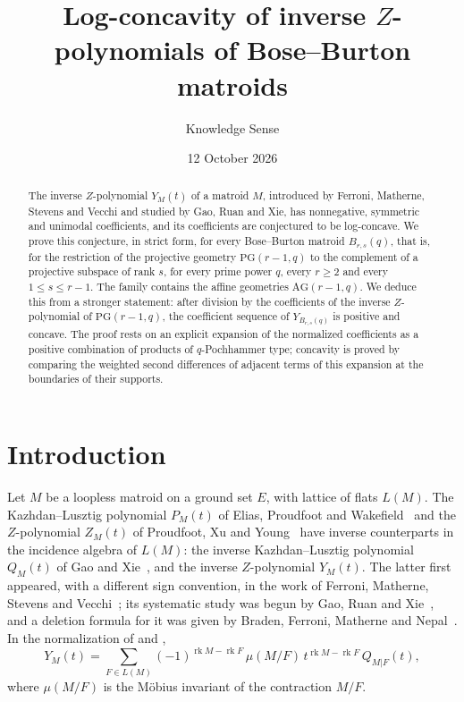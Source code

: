\documentclass{amsart}
\theoremstyle{remark}
\numberwithin{equation}{section}
\newcommand{\PG}{\mathrm{PG}}
\newcommand{\AG}{\mathrm{AG}}
\newcommand{\rk}{\operatorname{rk}}
\begin{document}
\title[Inverse $Z$-polynomials of Bose--Burton matroids]{Log-concavity of inverse $Z$-polynomials of Bose--Burton matroids}

\author{Knowledge Sense}

\date{12 October 2026}



\begin{abstract}
The inverse $Z$-polynomial $Y_M(t)$ of a matroid $M$, introduced by Ferroni, Matherne, Stevens and Vecchi and studied by Gao, Ruan and Xie, has nonnegative, symmetric and unimodal coefficients, and its coefficients are conjectured to be log-concave. We prove this conjecture, in strict form, for every Bose--Burton matroid $B_{r,s}(q)$, that is, for the restriction of the projective geometry $\PG(r-1,q)$ to the complement of a projective subspace of rank $s$, for every prime power $q$, every $r\ge 2$ and every $1\le s\le r-1$. The family contains the affine geometries $\AG(r-1,q)$. We deduce this from a stronger statement: after division by the coefficients of the inverse $Z$-polynomial of $\PG(r-1,q)$, the coefficient sequence of $Y_{B_{r,s}(q)}$ is positive and concave. The proof rests on an explicit expansion of the normalized coefficients as a positive combination of products of $q$-Pochhammer type; concavity is proved by comparing the weighted second differences of adjacent terms of this expansion at the boundaries of their supports.
\end{abstract}

\maketitle

\section{Introduction}

Let $M$ be a loopless matroid on a ground set $E$, with lattice of flats $L(M)$. The Kazhdan--Lusztig polynomial $P_M(t)$ of Elias, Proudfoot and Wakefield~\cite{EPW} and the $Z$-polynomial $Z_M(t)$ of Proudfoot, Xu and Young~\cite{PXY} have inverse counterparts in the incidence algebra of $L(M)$: the inverse Kazhdan--Lusztig polynomial $Q_M(t)$ of Gao and Xie~\cite{GX}, and the inverse $Z$-polynomial $Y_M(t)$. The latter first appeared, with a different sign convention, in the work of Ferroni, Matherne, Stevens and Vecchi~\cite{FMSV}; its systematic study was begun by Gao, Ruan and Xie~\cite{GRX}, and a deletion formula for it was given by Braden, Ferroni, Matherne and Nepal~\cite{BFMN}. In the normalization of \cite[(2)--(3)]{GRX} and \cite[Theorem~2.2]{BFMN},
\begin{equation}\label{eq:Ydef}
  Y_M(t)=\sum_{F\in L(M)}(-1)^{\rk M-\rk F}\,\mu(M/F)\,t^{\rk M-\rk F}\,Q_{M|F}(t),
\end{equation}
where $\mu(M/F)$ is the M\"obius invariant of the contraction $M/F$.
\end{document}
